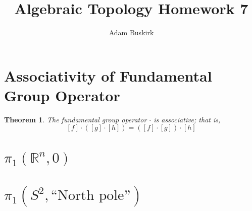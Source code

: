 \documentclass{article}
\title{Algebraic Topology Homework 7}
\author{Adam Buskirk}
\newtheorem{theorem}[subsection]{Theorem}
\theoremstyle{definition}
\newcommand{\R}{\mathbb{R}}
\begin{document}
\maketitle

\section{Associativity of Fundamental Group Operator}
\begin{theorem}
The fundamental group operator $\cdot$ is associative; that is,
\[ 
[f] \cdot ([g] \cdot [h]) 
= 
([f] \cdot [g]) \cdot [h]
\]
\end{theorem}

\section{$\pi_1(\R^n,0)$}

\section{$\pi_1(S^2,\text{``North pole''})$}
\end{document}
